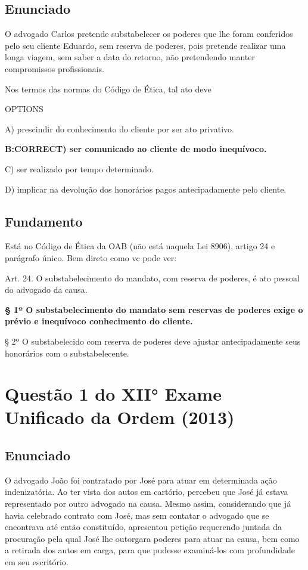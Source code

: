 \documentclass[12pt]{article}
\begin{document}
\subsection{Enunciado}

O advogado Carlos pretende substabelecer os poderes que lhe 
foram conferidos pelo seu cliente Eduardo, sem reserva de 
poderes, pois pretende realizar uma longa viagem, sem saber 
a data do retorno, não pretendendo manter compromissos 
profissionais. 
 
Nos termos das normas do Código de Ética, tal ato deve 
 
OPTIONS

A) prescindir do conhecimento do cliente por ser ato 
privativo. 

\textbf{B:CORRECT) ser comunicado ao cliente de modo inequívoco.}

C) ser realizado por tempo determinado. 

D) implicar na devolução dos honorários pagos 
antecipadamente pelo cliente.

\subsection{Fundamento}

Está no Código de Ética da OAB (não está naquela Lei 8906), artigo 24 e parágrafo único. Bem direto como vc pode ver:

Art. 24. O substabelecimento  do  mandato,  com  reserva  de poderes,  é  ato  pessoal  do advogado da causa.  

\textbf{§ 1º O  substabelecimento  do  mandato  sem  reservas  de  poderes  exige  o  prévio  e inequívoco conhecimento do cliente.}

§ 2º O substabelecido com reserva de poderes deve ajustar antecipadamente seus honorários com o substabelecente. 
 
\section{Questão 1 do XII° Exame Unificado da Ordem (2013)}

\subsection{Enunciado}

O advogado João foi contratado por José para atuar em 
determinada ação indenizatória. Ao ter vista dos autos em 
cartório, percebeu que José já estava representado por outro 
advogado na causa. Mesmo assim, considerando que já havia 
celebrado contrato com José, mas sem contatar o advogado 
que se encontrava até então constituído, apresentou petição 
requerendo juntada da procuração pela qual José lhe 
outorgara poderes para atuar na causa, bem como a retirada 
dos autos em carga, para que pudesse examiná-los com 
profundidade em seu escritório.  
 
\end{document}
